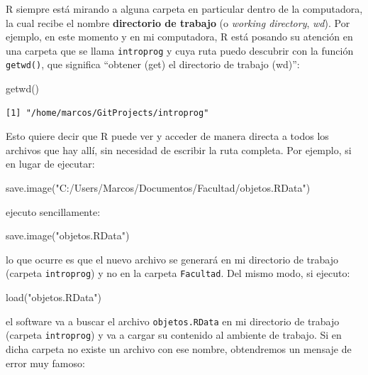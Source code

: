\documentclass[
]{book}
\newenvironment{Shaded}{\begin{snugshade}}{\end{snugshade}}
\newcommand{\FunctionTok}[1]{\textcolor[rgb]{0.00,0.00,0.00}{#1}}
\newcommand{\NormalTok}[1]{#1}
\newcommand{\StringTok}[1]{\textcolor[rgb]{0.31,0.60,0.02}{#1}}
\begin{document}
R siempre está mirando a alguna carpeta en particular dentro de la computadora, la cual recibe el nombre \textbf{directorio de trabajo} (o \emph{working directory}, \emph{wd}). Por ejemplo, en este momento y en mi computadora, R está posando su atención en una carpeta que se llama \texttt{introprog} y cuya ruta puedo descubrir con la función \texttt{getwd()}, que significa ``obtener (get) el directorio de trabajo (wd)'':

\begin{Shaded}
\begin{Highlighting}[]
\FunctionTok{getwd}\NormalTok{()}
\end{Highlighting}
\end{Shaded}

\begin{verbatim}
[1] "/home/marcos/GitProjects/introprog"
\end{verbatim}

Esto quiere decir que R puede ver y acceder de manera directa a todos los archivos que hay allí, sin necesidad de escribir la ruta completa. Por ejemplo, si en lugar de ejecutar:

\begin{Shaded}
\begin{Highlighting}[]
\FunctionTok{save.image}\NormalTok{(}\StringTok{"C:/Users/Marcos/Documentos/Facultad/objetos.RData"}\NormalTok{)}
\end{Highlighting}
\end{Shaded}

ejecuto sencillamente:

\begin{Shaded}
\begin{Highlighting}[]
\FunctionTok{save.image}\NormalTok{(}\StringTok{"objetos.RData"}\NormalTok{)}
\end{Highlighting}
\end{Shaded}

lo que ocurre es que el nuevo archivo se generará en mi directorio de trabajo (carpeta \texttt{introprog}) y no en la carpeta \texttt{Facultad}. Del mismo modo, si ejecuto:

\begin{Shaded}
\begin{Highlighting}[]
\FunctionTok{load}\NormalTok{(}\StringTok{"objetos.RData"}\NormalTok{)}
\end{Highlighting}
\end{Shaded}

el software va a buscar el archivo \texttt{objetos.RData} en mi directorio de trabajo (carpeta \texttt{introprog}) y va a cargar su contenido al ambiente de trabajo. Si en dicha carpeta no existe un archivo con ese nombre, obtendremos un mensaje de error muy famoso:
\end{document}
